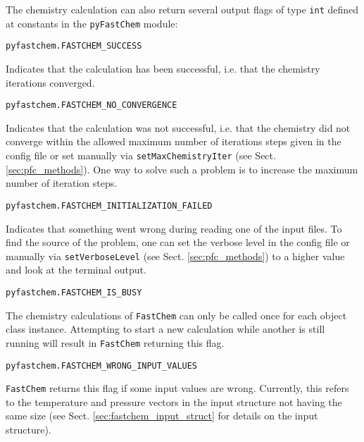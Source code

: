 \documentclass[numbers=noenddot]{fcmanual}
\newcommand{\fc}{\texttt{FastChem}\xspace}
\newcommand{\pfc}{\texttt{pyFastChem}\xspace}
\begin{document}
The chemistry calculation can also return several output flags of type \lstinline!int! defined at constants in the \pfc module:

\lstinline!pyfastchem.FASTCHEM_SUCCESS!
\begin{addmargin}[25pt]{0pt}
  Indicates that the calculation has been successful, i.e. that the chemistry iterations converged.
\end{addmargin}
  
\bigbreak
  
\lstinline!pyfastchem.FASTCHEM_NO_CONVERGENCE!
\begin{addmargin}[25pt]{0pt}
  Indicates that the calculation was not successful, i.e. that the chemistry did not converge within the allowed maximum number of iterations steps given in the config file or set manually via \lstinline!setMaxChemistryIter! (see Sect. \ref{sec:pfc_methods}). One way to solve such a problem is to increase the maximum number of iteration steps.
\end{addmargin}
    
\bigbreak
    
\lstinline!pyfastchem.FASTCHEM_INITIALIZATION_FAILED!
\begin{addmargin}[25pt]{0pt}
  Indicates that something went wrong during reading one of the input files. To find the source of the problem, one can set the verbose level in the config file or manually via \lstinline!setVerboseLevel! (see Sect. \ref{sec:pfc_methods}) to a higher value and look at the terminal output.
\end{addmargin}
      
\bigbreak
      
\lstinline!pyfastchem.FASTCHEM_IS_BUSY!
\begin{addmargin}[25pt]{0pt}
  The chemistry calculations of \fc can only be called once for each object class instance. Attempting to start a new calculation while another is still running will result in \fc returning this flag.
\end{addmargin}
        
\bigbreak
        
\lstinline!pyfastchem.FASTCHEM_WRONG_INPUT_VALUES!
\begin{addmargin}[25pt]{0pt}
  \fc returns this flag if some input values are wrong. Currently, this refers to the temperature and pressure vectors in the input structure not having the same size (see Sect. \ref{sec:fastchem_input_struct} for details on the input structure).
\end{addmargin}
\end{document}
